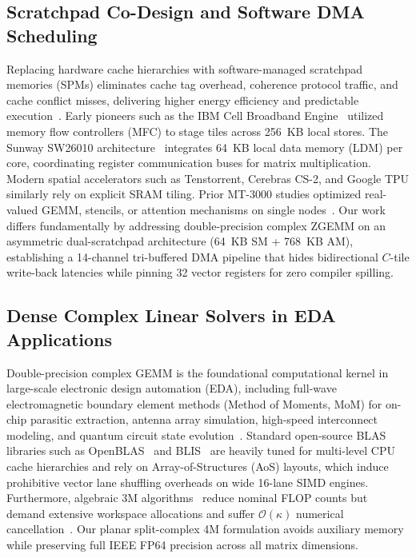 \documentclass[conference]{IEEEtran}
\begin{document}
\subsection{Scratchpad Co-Design and Software DMA Scheduling}
Replacing hardware cache hierarchies with software-managed scratchpad memories (SPMs) eliminates cache tag overhead, coherence protocol traffic, and cache conflict misses, delivering higher energy efficiency and predictable execution~\cite{kahle2005cell, igual2012dsp, fu2016sunway}. Early pioneers such as the IBM Cell Broadband Engine~\cite{kahle2005cell} utilized memory flow controllers (MFC) to stage tiles across 256~KB local stores. The Sunway SW26010 architecture~\cite{fu2016sunway, jiang2017sw26010} integrates 64~KB local data memory (LDM) per core, coordinating register communication buses for matrix multiplication. Modern spatial accelerators such as Tenstorrent, Cerebras CS-2, and Google TPU similarly rely on explicit SRAM tiling. Prior MT-3000 studies optimized real-valued GEMM, stencils, or attention mechanisms on single nodes~\cite{lu2022mt3000, li2024md, fang2026mtgemm, mo2024irregular, qi2025constraint, qi2026attention}. Our work differs fundamentally by addressing double-precision complex ZGEMM on an asymmetric dual-scratchpad architecture (64~KB SM + 768~KB AM), establishing a 14-channel tri-buffered DMA pipeline that hides bidirectional $C$-tile write-back latencies while pinning 32 vector registers for zero compiler spilling.

\subsection{Dense Complex Linear Solvers in EDA Applications}
Double-precision complex GEMM is the foundational computational kernel in large-scale electronic design automation (EDA), including full-wave electromagnetic boundary element methods (Method of Moments, MoM) for on-chip parasitic extraction, antenna array simulation, high-speed interconnect modeling, and quantum circuit state evolution~\cite{barrett2010complexhpl, vanzee2017complex}. Standard open-source BLAS libraries such as OpenBLAS~\cite{zhang2012openblas} and BLIS~\cite{vanzee2015blis, vanzee2017complex} are heavily tuned for multi-level CPU cache hierarchies and rely on Array-of-Structures (AoS) layouts, which induce prohibitive vector lane shuffling overheads on wide 16-lane SIMD engines. Furthermore, algebraic 3M algorithms~\cite{vanzee2017complex} reduce nominal FLOP counts but demand extensive workspace allocations and suffer $\mathcal{O}(\kappa)$ numerical cancellation~\cite{higham2002accuracy}. Our planar split-complex 4M formulation avoids auxiliary memory while preserving full IEEE FP64 precision across all matrix dimensions.
\end{document}
